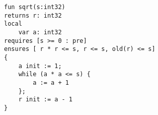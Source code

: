                                                                          
\begin{lstlisting}[caption=Zugriff auf uninitialisierter Wert in preexecution State.]
fun sqrt(s:int32)
returns r: int32
local 
    var a: int32
requires [s >= 0 : pre]
ensures [ r * r <= s, r <= s, old(r) <= s]
{
    a init := 1;
    while (a * a <= s) {
        a := a + 1
    };      
    r init := a - 1
}
\end{lstlisting}
